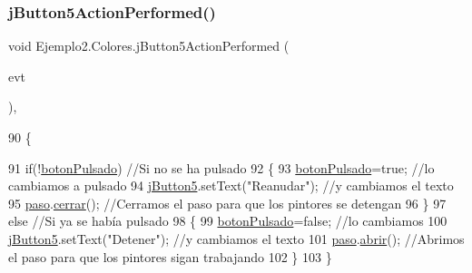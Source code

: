 \subsubsection{\texorpdfstring{j\+Button5\+Action\+Performed()}{jButton5ActionPerformed()}}
{\footnotesize\ttfamily void Ejemplo2.\+Colores.\+j\+Button5\+Action\+Performed (\begin{DoxyParamCaption}\item[{java.\+awt.\+event.\+Action\+Event}]{evt }\end{DoxyParamCaption})\hspace{0.3cm}{\ttfamily [inline]}, {\ttfamily [private]}}


\begin{DoxyCode}
90                                                                          \{                                 
             
91         \textcolor{keywordflow}{if}(!\mbox{\hyperlink{class_ejemplo2_1_1_colores_a9e166190bfd45aea03b8c118cc6c47fb}{botonPulsado}}) \textcolor{comment}{//Si no se ha pulsado}
92         \{                
93             \mbox{\hyperlink{class_ejemplo2_1_1_colores_a9e166190bfd45aea03b8c118cc6c47fb}{botonPulsado}}=\textcolor{keyword}{true};             \textcolor{comment}{//lo cambiamos a pulsado}
94             \mbox{\hyperlink{class_ejemplo2_1_1_colores_a35c6c2ec6c3ceb50aa3eb4b65558fc0f}{jButton5}}.setText(\textcolor{stringliteral}{"Reanudar"});  \textcolor{comment}{//y cambiamos el texto}
95             \mbox{\hyperlink{class_ejemplo2_1_1_colores_acd6cc98bfb842a0c3977d527e740bf24}{paso}}.\mbox{\hyperlink{class_ejemplo2_1_1_paso_aef2fe3c01a50bc9b3b2351d3ce067d5b}{cerrar}}();    \textcolor{comment}{//Cerramos el paso para que los pintores se detengan}
96         \}
97         \textcolor{keywordflow}{else} \textcolor{comment}{//Si ya se había pulsado}
98         \{                          
99             \mbox{\hyperlink{class_ejemplo2_1_1_colores_a9e166190bfd45aea03b8c118cc6c47fb}{botonPulsado}}=\textcolor{keyword}{false};            \textcolor{comment}{//lo cambiamos}
100             \mbox{\hyperlink{class_ejemplo2_1_1_colores_a35c6c2ec6c3ceb50aa3eb4b65558fc0f}{jButton5}}.setText(\textcolor{stringliteral}{"Detener"});  \textcolor{comment}{//y cambiamos el texto}
101             \mbox{\hyperlink{class_ejemplo2_1_1_colores_acd6cc98bfb842a0c3977d527e740bf24}{paso}}.\mbox{\hyperlink{class_ejemplo2_1_1_paso_a257040915c16c05d7c914cecfc4b26fa}{abrir}}();    \textcolor{comment}{//Abrimos el paso para que los pintores sigan trabajando}
102         \}
103     \}                                       
\end{DoxyCode}
\mbox{\label{class_ejemplo2_1_1_colores_af7d88f830e3d1ade0f6086235fbde21a}} 
